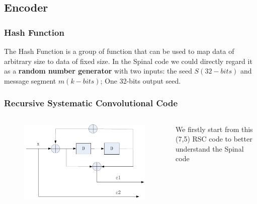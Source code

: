 \documentclass{beamer}
\begin{document}
\subsection{Encoder}
\begin{frame}
\frametitle{Hash Function}
The Hash Function is a group of function that can be used to map data of arbitrary size to data of fixed size. In the Spinal code we could directly regard it as a \textbf{random number generator} with two inputs: the seed $S(32-bits)$ and message segment $m(k-bits)$; One 32-bits output seed. 
\end{frame}
\begin{frame}
\frametitle{Recursive Systematic Convolutional Code}
\begin{columns}
\begin{figure}
\includegraphics[width=.99\textwidth]{Rsccode.pdf}
\end{figure}
We firstly start from this (7,5) RSC code to better understand the Spinal code
\end{columns}
\end{frame}
\end{document}

